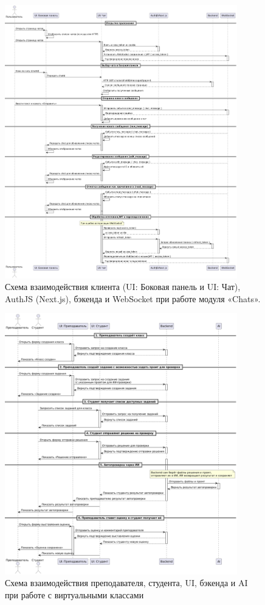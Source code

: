 \begin{figure}[H]
    \centering
    \includegraphics[width=0.9\textwidth]{static/diagrams/Chats.png}
    \caption{Схема взаимодействия клиента (UI: Боковая панель и UI: Чат), AuthJS (Next.js), бэкенда и WebSocket при работе модуля «Chats».}
    \label{fig:chats-flow}
\end{figure}


\begin{figure}[H]
    \centering
    \includegraphics[width=0.9\textwidth]{static/diagrams/Classroom.png}
    \caption{Схема взаимодействия преподавателя, студента, UI, бэкенда и AI при работе с виртуальными классами}
    \label{fig:classroom-flow}
\end{figure}

